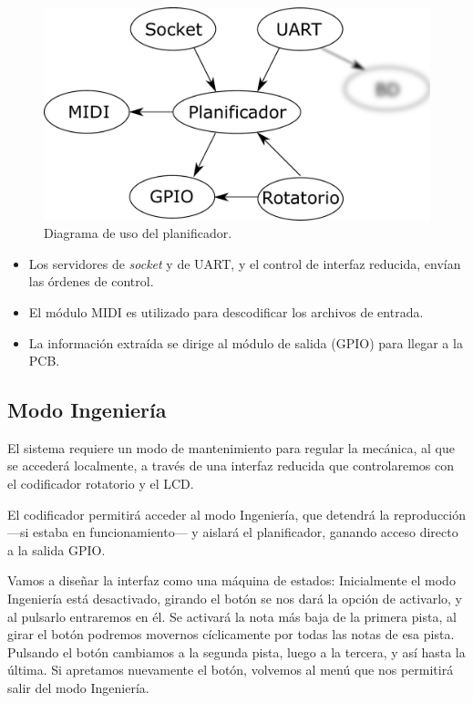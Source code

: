 \begin{figure}[H]
	\noindent \begin{centering}
		\includegraphics[width=\linewidth/2]{capitulo4/daemon_scheduler}
		\par\end{centering}
	\smallskip
	\caption{\label{fig:daemon_scheduler} Diagrama de uso del planificador.}
\end{figure} 

\smallskip

\begin{itemize}
	\item Los servidores de \textit{socket} y de \acrshort{UART}, y el control de interfaz reducida, envían las órdenes de control.
	\item El módulo \acrshort{MIDI} es utilizado para descodificar los archivos de entrada.
	\item La información extraída se dirige al módulo de salida (\acrshort{GPIO}) para llegar a la \acrshort{PCB}.
\end{itemize}

\subsection{Modo Ingeniería}

El sistema requiere un modo de mantenimiento para regular la mecánica, al que se accederá localmente, a través de una interfaz reducida que controlaremos con el codificador rotatorio y el \acrshort{LCD}.

El codificador permitirá acceder al modo Ingeniería, que detendrá la reproducción ---si estaba en funcionamiento--- y  aislará el planificador, ganando acceso directo a la salida \acrshort{GPIO}.

Vamos a diseñar la interfaz como una máquina de estados: Inicialmente el modo Ingeniería está desactivado, girando el botón se nos dará la opción de activarlo, y al pulsarlo entraremos en él. Se activará la nota más baja de la primera pista, al girar el botón podremos movernos cíclicamente por todas las notas de esa pista. Pulsando el botón cambiamos a la segunda pista, luego a la tercera, y así hasta la última. Si apretamos nuevamente el botón, volvemos al menú que nos permitirá salir del modo Ingeniería.

